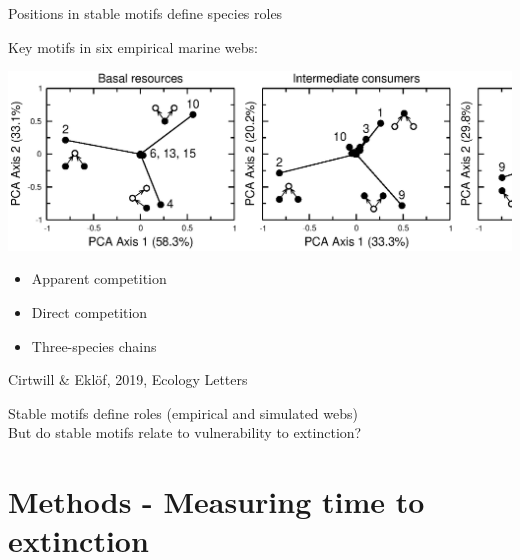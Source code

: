 \documentclass{beamer}
\begin{document}
  \begin{frame}{Positions in stable motifs define species roles}

    \begin{block}{Key motifs in six empirical marine webs:}

    \begin{centering}

      \includegraphics[width=\textwidth]{Eklof_figs/PCA_positions.eps}

    \end{centering}

    \begin{itemize}
      \item Apparent competition
      \item Direct competition
      \item Three-species chains
    \end{itemize}
    \end{block}
    \vspace{-0.5cm}
    {\tiny Cirtwill \& Ekl\"{o}f, 2019, Ecology Letters}

    {\color{DarkBlue}Stable motifs define roles (empirical and simulated webs)}\\
    {\color{DarkBlue}But do stable motifs relate to vulnerability to extinction?}

    \end{frame}


\section*{Methods - Measuring time to extinction}
\end{document}
